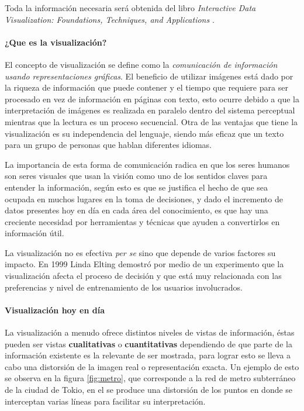 \documentclass[12pt]{article}
\begin{document}
	Toda la información necesaria será obtenida del libro \textit{Interactive Data Visualization: Foundations, Techniques, and Applications} \cite{libro_visualizacion}.

	\paragraph{¿Que es la visualización?}
	
	El concepto de visualización se define como la \textit{comunicación de información usando representaciones gráficas}. El beneficio de utilizar imágenes está dado por la riqueza de información que puede contener y el tiempo que requiere para ser procesado en vez de información en páginas con texto, esto ocurre debido a que la interpretación de imágenes es realizada en paralelo dentro del sistema perceptual mientras que la lectura es un proceso secuencial. Otra de las ventajas que tiene la visualización es su independencia del lenguaje, siendo más eficaz que un texto para un grupo de personas que hablan diferentes idiomas. 
	
	La importancia de esta forma de comunicación radica en que los seres humanos son seres visuales que usan la visión como uno de los sentidos claves para entender la información, según esto es que se justifica el hecho de que sea ocupada en muchos lugares en la toma de decisiones, y dado el incremento de datos presentes hoy en día en cada área del conocimiento, es que hay una creciente necesidad por herramientas y técnicas que ayuden a convertirlos en información útil. 
	
	La visualización no es efectiva \textit{per se} sino que depende de varios factores su impacto. En 1999 Linda Elting demostró por medio de un experimento que la visualización afecta el proceso de decisión y que está muy relacionada con las preferencias y nivel de entrenamiento de los usuarios involucrados.
    
	\paragraph{Visualización hoy en día}    
	
	La visualización a menudo ofrece distintos niveles de vistas de información, éstas pueden ser vistas \textbf{cualitativas} o \textbf{cuantitativas} dependiendo de que parte de la información existente es la relevante de ser mostrada, para lograr esto se lleva a cabo una distorsión de la imagen real o representación exacta. Un ejemplo de esto se observa en la figura \ref{fig:metro}, que corresponde a la red de metro subterráneo de la ciudad de Tokio, en el se produce una distorsión de los puntos en donde se interceptan varias líneas para facilitar su interpretación. 
		
\end{document}
